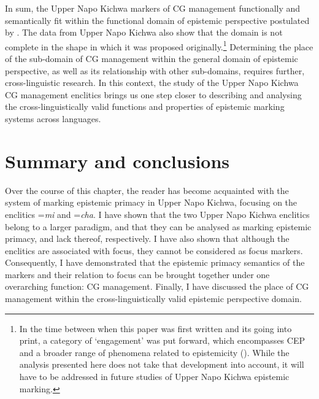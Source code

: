 \documentclass[output=paper]{langscibook}
\begin{document}
In sum, the Upper Napo Kichwa markers of CG management functionally and semantically fit within the functional domain of epistemic perspective postulated by \cite{Bergqvist2017}. The data from Upper Napo Kichwa also show that the domain is not complete in the shape in which it was proposed originally.\footnote{In the time between when this paper was first written and its going into print, a category of ‘engagement’ was put forward, which encompasses CEP and a broader range of phenomena related to epistemicity (\citealt{Evansetal2018}). While the analysis presented here does not take that development into account, it will have to be addressed in future studies of Upper Napo Kichwa epistemic marking.} 
Determining the place of the sub-domain of CG management within the general domain of epistemic perspective, as well as its relationship with other sub-domains, requires further, cross-linguistic research. In this context, the study of the Upper Napo Kichwa CG management enclitics brings us one step closer to describing and analysing the cross-linguistically valid functions and properties of epistemic marking systems across languages. 


\section{Summary and conclusions}\label{s:kg7}

Over the course of this chapter, the reader has become acquainted with the system of marking epistemic primacy in Upper Napo Kichwa, focusing on the enclitics =\textit{mi} and =\textit{cha}. I have shown that the two Upper Napo Kichwa enclitics belong to a larger paradigm, and that they can be analysed as marking epistemic primacy, and lack thereof, respectively. I have also shown that although the enclitics are associated with focus, they cannot be considered as focus markers. Consequently, I have demonstrated that the epistemic primacy semantics of the markers and their relation to focus can be brought together under one overarching function: CG management. Finally, I have discussed the place of CG management within the cross-linguistically valid epistemic perspective domain.
\end{document}
